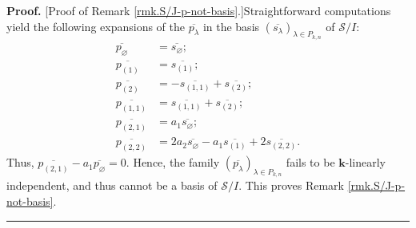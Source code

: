 \documentclass[numbers=enddot,12pt,final,onecolumn,notitlepage]{scrartcl}%
\theoremstyle{definition}
\newenvironment{proof}[1][Proof]{\noindent\textbf{#1.} }{\ \rule{0.5em}{0.5em}}
\begin{document}
\begin{proof}
[Proof of Remark \ref{rmk.S/J-p-not-basis}.]Straightforward computations yield
the following expansions of the $\overline{p_{\lambda}}$ in the basis $\left(
\overline{s_{\lambda}}\right)  _{\lambda\in P_{k,n}}$ of $\mathcal{S}/I$:%
\begin{align*}
\overline{p_{\varnothing}}  &  =\overline{s_{\varnothing}};\\
\overline{p_{\left(  1\right)  }}  &  =\overline{s_{\left(  1\right)  }};\\
\overline{p_{\left(  2\right)  }}  &  =-\overline{s_{\left(  1,1\right)  }%
}+\overline{s_{\left(  2\right)  }};\\
\overline{p_{\left(  1,1\right)  }}  &  =\overline{s_{\left(  1,1\right)  }%
}+\overline{s_{\left(  2\right)  }};\\
\overline{p_{\left(  2,1\right)  }}  &  =a_{1}\overline{s_{\varnothing}};\\
\overline{p_{\left(  2,2\right)  }}  &  =2a_{2}\overline{s_{\varnothing}%
}-a_{1}\overline{s_{\left(  1\right)  }}+2\overline{s_{\left(  2,2\right)  }}.
\end{align*}
Thus, $\overline{p_{\left(  2,1\right)  }}-a_{1}\overline{p_{\varnothing}}=0$.
Hence, the family $\left(  \overline{p_{\lambda}}\right)  _{\lambda\in
P_{k,n}}$ fails to be $\mathbf{k}$-linearly independent, and thus cannot be a
basis of $\mathcal{S}/I$. This proves Remark \ref{rmk.S/J-p-not-basis}.
\end{proof}
\end{document}
